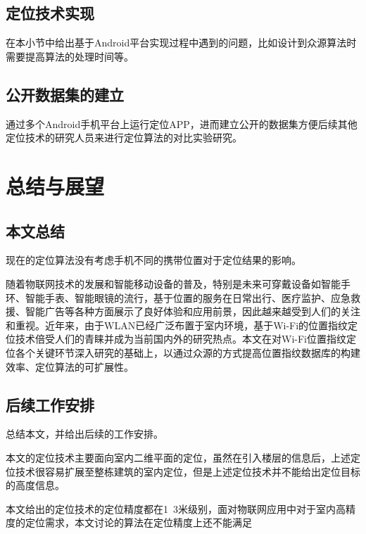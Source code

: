 \section{定位技术实现}

在本小节中给出基于Android平台实现过程中遇到的问题，比如设计到众源算法时需要提高算法的处理时间等。

\section{公开数据集的建立}

通过多个Android手机平台上运行定位APP，进而建立公开的数据集方便后续其他定位技术的研究人员来进行定位算法的对比实验研究。




\chapter{总结与展望}

\section{本文总结}

现在的定位算法没有考虑手机不同的携带位置对于定位结果的影响。

随着物联网技术的发展和智能移动设备的普及，特别是未来可穿戴设备如智能手环、智能手表、智能眼镜的流行，基于位置的服务在日常出行、医疗监护、应急救援、智能广告等各种方面展示了良好体验和应用前景，因此越来越受到人们的关注和重视。近年来，由于WLAN已经广泛布置于室内环境，基于Wi-Fi的位置指纹定位技术倍受人们的青睐并成为当前国内外的研究热点。本文在对Wi-Fi位置指纹定位各个关键环节深入研究的基础上，以通过众源的方式提高位置指纹数据库的构建效率、定位算法的可扩展性。

\section{后续工作安排}

总结本文，并给出后续的工作安排。

本文的定位技术主要面向室内二维平面的定位，虽然在引入楼层的信息后，上述定位技术很容易扩展至整栋建筑的室内定位，但是上述定位技术并不能给出定位目标的高度信息。

本文给出的定位技术的定位精度都在1~3米级别，面对物联网应用中对于室内高精度的定位需求，本文讨论的算法在定位精度上还不能满足

